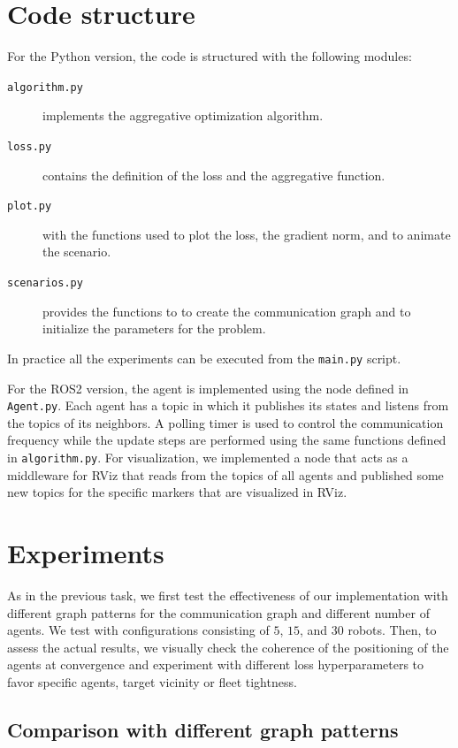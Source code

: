 \documentclass[a4paper,11pt,oneside]{book}
\begin{document}
\section{Code structure}
For the Python version, the code is structured with the following modules:
\begin{description}
      \item[\texttt{algorithm.py}] implements the aggregative optimization algorithm.
      \item[\texttt{loss.py}] contains the definition of the loss and the aggregative function.
      \item[\texttt{plot.py}] with the functions used to plot the loss, the gradient norm, and to animate the scenario.
      \item[\texttt{scenarios.py}] provides the functions to to create the communication graph and to initialize the parameters for the problem.
\end{description}
In practice all the experiments can be executed from the \texttt{main.py} script.

For the ROS2 version, the agent is implemented using the node defined in \texttt{Agent.py}. Each agent has a topic in which it publishes its states and listens from the topics of its neighbors. A polling timer is used to control the communication frequency while the update steps are performed using the same functions defined in \texttt{algorithm.py}. For visualization, we implemented a node that acts as a middleware for RViz that reads from the topics of all agents and published some new topics for the specific markers that are visualized in RViz.

\section{Experiments}

As in the previous task, we first test the effectiveness of our implementation with different graph patterns for the communication graph and different number of agents. We test with configurations consisting of $5$, $15$, and $30$ robots. Then, to assess the actual results, we visually check the coherence of the positioning of the agents at convergence and experiment with different loss hyperparameters to favor specific agents, target vicinity or fleet tightness.


\subsection{Comparison with different graph patterns}
\end{document}
